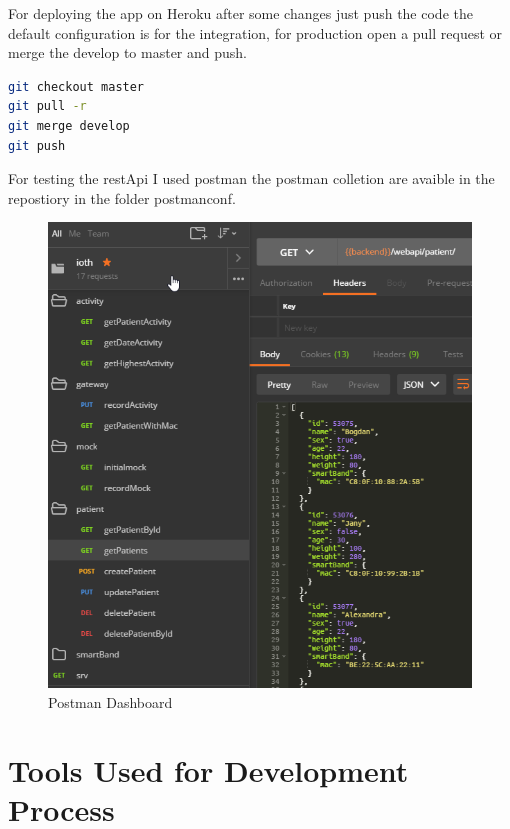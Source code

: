For deploying the app on Heroku after some changes just push the code the default configuration is for the integration, for production open a pull request or merge the develop to master and push.
\begin{lstlisting}[language=Bash]
git checkout master
git pull -r
git merge develop
git push
\end{lstlisting}

For testing the restApi I used postman the postman colletion are avaible in the repostiory in the folder postmanconf.
\begin{figure}[h]
	\centering
	\includegraphics[width=0.6\linewidth]{images/postman}
	\caption{Postman Dashboard}
	\label{fig:postman}
\end{figure}

\section{Tools Used for Development Process}
